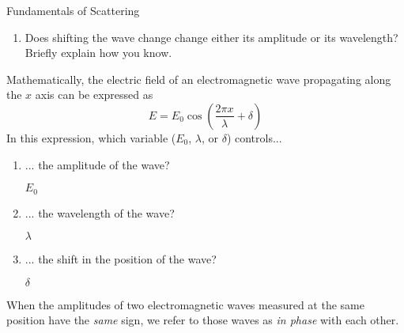 \begin{activity}{Fundamentals of Scattering}
\begin{ctqs}
\begin{enumerate}
				\begin{solution}[1.5in]\end{solution}
			
			\item Does shifting the wave change change either its amplitude or its wavelength?  Briefly explain how you know.
			
				\begin{solution}[1in]
				\end{solution}
				
		\end{enumerate}

	\question Mathematically, the electric field of an electromagnetic wave propagating along the $x$ axis can be expressed as
	\begin{equation*}
		E = E_0 \cos\left( \frac{2\pi x}{\lambda} + \delta \right)
	\end{equation*}
	In this expression, which variable ($E_0$, $\lambda$, or $\delta$) controls...
	
		\begin{enumerate}
		
			\item ... the amplitude of the wave?
			
				\begin{solution}[0.25in]
					$E_0$
				\end{solution}
			
			\item ... the wavelength of the wave?
			
				\begin{solution}[0.25in]
					$\lambda$
				\end{solution}
			
			\item ... the shift in the position of the wave?
			
				\begin{solution}[0.25in]
					$\delta$
				\end{solution}
		
		\end{enumerate}
		
\end{ctqs}

\begin{infobox}
	When the amplitudes of two electromagnetic waves measured at the same position have the \emph{same} sign, we refer to those waves as \emph{in phase} with each other.
	

\end{infobox}
\end{activity}
